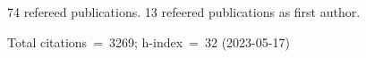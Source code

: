 74 refereed publications. 13 refeered publications as first author.

Total citations~=~3269; h-index~=~32 (2023-05-17)